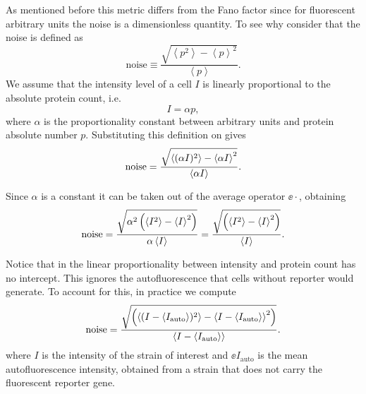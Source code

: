 As mentioned before this metric differs from the Fano factor since for
fluorescent arbitrary units the noise is a dimensionless quantity. To see why
consider that the noise is defined as
\begin{equation}
\text{noise} \equiv \frac{\sqrt{\left\langle p^2 \right\rangle -
                        \left\langle p \right\rangle^2}}
                        {\left\langle p \right\rangle}.
    \label{seq_noise_protein}
\end{equation}
We assume that the intensity level of a cell $I$ is linearly proportional to
the absolute protein count, i.e.
\begin{equation}
I = \alpha p,
\label{seq_calibration_factor}
\end{equation}
where $\alpha$ is the proportionality constant between arbitrary units and
protein absolute number $p$. Substituting this definition on
 gives
\begin{equation}
  \text{noise} = {\sqrt{\left\langle (\alpha I)^2 \right\rangle - \left\langle \alpha I \right\rangle^2} \over
                \left\langle \alpha I \right\rangle}.
\end{equation}

Since $\alpha$ is a constant it can be taken out of the average operator
$\ee{\cdot}$, obtaining
\begin{equation}
  \text{noise} = {\sqrt{\alpha^2 \left(\left\langle I^2 \right\rangle -
                \left\langle I \right\rangle^2 \right)} \over
                \alpha \left\langle I \right\rangle}
       = {\sqrt{\left(\left\langle I^2 \right\rangle - \left\langle I \right\rangle^2 \right)} \over
                \left\langle I \right\rangle}.
\end{equation}

Notice that in  the linear proportionality between
intensity and protein count has no intercept. This ignores the autofluorescence
that cells without reporter would generate. To account for this, in practice we
compute
\begin{equation}
\text{noise} = {\sqrt{\left(\left\langle (I - \left\langle I_\text{auto} \right\rangle)^2 \right\rangle -
                    \left\langle I - \left\langle I_\text{auto} \right\rangle \right\rangle^2 \right)} \over
                \left\langle I - \left\langle I_\text{auto} \right\rangle \right\rangle}.
\end{equation}
where $I$ is the intensity of the strain of interest and $\ee{I_\text{auto}}$
is the mean autofluorescence intensity, obtained from a strain that does not
carry the fluorescent reporter gene.

